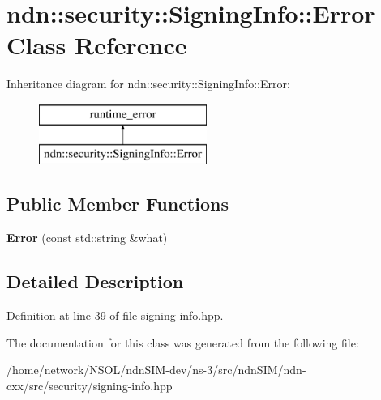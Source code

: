 \hypertarget{classndn_1_1security_1_1SigningInfo_1_1Error}{}\section{ndn\+:\+:security\+:\+:Signing\+Info\+:\+:Error Class Reference}
\label{classndn_1_1security_1_1SigningInfo_1_1Error}
Inheritance diagram for ndn\+:\+:security\+:\+:Signing\+Info\+:\+:Error\+:\begin{figure}[H]
\begin{center}
\leavevmode
\includegraphics[height=2.000000cm]{classndn_1_1security_1_1SigningInfo_1_1Error}
\end{center}
\end{figure}
\subsection*{Public Member Functions}
\begin{DoxyCompactItemize}
\item 
{\bfseries Error} (const std\+::string \&what)\hypertarget{classndn_1_1security_1_1SigningInfo_1_1Error_a729f8f3f0cf26623f0dbf471b192e548}{}\label{classndn_1_1security_1_1SigningInfo_1_1Error_a729f8f3f0cf26623f0dbf471b192e548}

\end{DoxyCompactItemize}


\subsection{Detailed Description}


Definition at line 39 of file signing-\/info.\+hpp.



The documentation for this class was generated from the following file\+:\begin{DoxyCompactItemize}
\item 
/home/network/\+N\+S\+O\+L/ndn\+S\+I\+M-\/dev/ns-\/3/src/ndn\+S\+I\+M/ndn-\/cxx/src/security/signing-\/info.\+hpp\end{DoxyCompactItemize}
